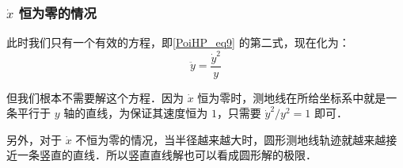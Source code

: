 \subsubsection{$\dot{x}$ 恒为零的情况}

{}

此时我们只有一个有效的方程，即\autoref{PoiHP_eq9} 的第二式，现在化为：
\begin{equation}
\ddot{y}=\frac{\dot{y}^2}{y}
\end{equation}

但我们根本不需要解这个方程．因为 $\dot{x}$ 恒为零时，测地线在所给坐标系中就是一条平行于 $y$ 轴的直线，为保证其速度恒为 $1$，只需要 $\dot{y}^2/y^2=1$ 即可．

另外，对于 $\dot{x}$ 不恒为零的情况，当半径越来越大时，圆形测地线轨迹就越来越接近一条竖直的直线．所以竖直直线解也可以看成圆形解的极限．






